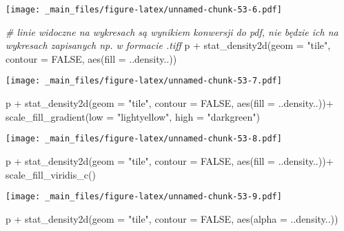\documentclass[
]{book}
\newenvironment{Shaded}{\begin{snugshade}}{\end{snugshade}}
\newcommand{\AttributeTok}[1]{\textcolor[rgb]{0.77,0.63,0.00}{#1}}
\newcommand{\CommentTok}[1]{\textcolor[rgb]{0.56,0.35,0.01}{\textit{#1}}}
\newcommand{\ConstantTok}[1]{\textcolor[rgb]{0.00,0.00,0.00}{#1}}
\newcommand{\FunctionTok}[1]{\textcolor[rgb]{0.00,0.00,0.00}{#1}}
\newcommand{\NormalTok}[1]{#1}
\newcommand{\SpecialCharTok}[1]{\textcolor[rgb]{0.00,0.00,0.00}{#1}}
\newcommand{\StringTok}[1]{\textcolor[rgb]{0.31,0.60,0.02}{#1}}
\begin{document}
\texttt{[image: \_main\_files/figure-latex/unnamed-chunk-53-6.pdf]}

\begin{Shaded}
\begin{Highlighting}[]
\CommentTok{\# linie widoczne na wykresach są wynikiem konwersji do pdf, nie będzie ich na wykresach zapisanych np. w formacie .tiff}
\NormalTok{p }\SpecialCharTok{+} \FunctionTok{stat\_density2d}\NormalTok{(}\AttributeTok{geom =} \StringTok{"tile"}\NormalTok{, }\AttributeTok{contour  =}  \ConstantTok{FALSE}\NormalTok{, }\FunctionTok{aes}\NormalTok{(}\AttributeTok{fill  =}\NormalTok{  ..density..))}
\end{Highlighting}
\end{Shaded}

\texttt{[image: \_main\_files/figure-latex/unnamed-chunk-53-7.pdf]}

\begin{Shaded}
\begin{Highlighting}[]
\NormalTok{p }\SpecialCharTok{+} \FunctionTok{stat\_density2d}\NormalTok{(}\AttributeTok{geom =} \StringTok{"tile"}\NormalTok{, }\AttributeTok{contour  =}  \ConstantTok{FALSE}\NormalTok{, }\FunctionTok{aes}\NormalTok{(}\AttributeTok{fill  =}\NormalTok{  ..density..))}\SpecialCharTok{+}
  \FunctionTok{scale\_fill\_gradient}\NormalTok{(}\AttributeTok{low  =}  \StringTok{"lightyellow"}\NormalTok{, }\AttributeTok{high  =}  \StringTok{"darkgreen"}\NormalTok{)}
\end{Highlighting}
\end{Shaded}

\texttt{[image: \_main\_files/figure-latex/unnamed-chunk-53-8.pdf]}

\begin{Shaded}
\begin{Highlighting}[]
\NormalTok{p }\SpecialCharTok{+} \FunctionTok{stat\_density2d}\NormalTok{(}\AttributeTok{geom =} \StringTok{"tile"}\NormalTok{, }\AttributeTok{contour  =}  \ConstantTok{FALSE}\NormalTok{, }\FunctionTok{aes}\NormalTok{(}\AttributeTok{fill  =}\NormalTok{  ..density..))}\SpecialCharTok{+}
  \FunctionTok{scale\_fill\_viridis\_c}\NormalTok{()}
\end{Highlighting}
\end{Shaded}

\texttt{[image: \_main\_files/figure-latex/unnamed-chunk-53-9.pdf]}

\begin{Shaded}
\begin{Highlighting}[]
\NormalTok{p }\SpecialCharTok{+} \FunctionTok{stat\_density2d}\NormalTok{(}\AttributeTok{geom =} \StringTok{"tile"}\NormalTok{, }\AttributeTok{contour  =}  \ConstantTok{FALSE}\NormalTok{, }\FunctionTok{aes}\NormalTok{(}\AttributeTok{alpha  =}\NormalTok{  ..density..))}
\end{Highlighting}
\end{Shaded}
\end{document}
